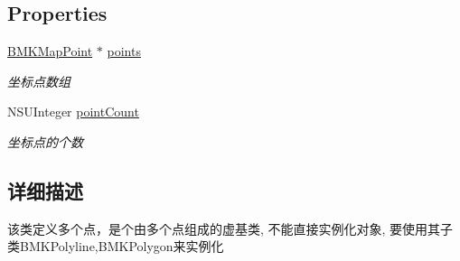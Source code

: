 \subsection*{Properties}
\begin{DoxyCompactItemize}
\item 
\hypertarget{interface_b_m_k_multi_point_aa810056a59644284eb13fca968124e0c}{\hyperlink{struct_b_m_k_map_point}{B\-M\-K\-Map\-Point} $\ast$ \hyperlink{interface_b_m_k_multi_point_aa810056a59644284eb13fca968124e0c}{points}}\label{interface_b_m_k_multi_point_aa810056a59644284eb13fca968124e0c}

\begin{DoxyCompactList}\small\item\em 坐标点数组 \end{DoxyCompactList}\item 
\hypertarget{interface_b_m_k_multi_point_a717b76bf8c1c25ce7ae11c959fb4af9f}{N\-S\-U\-Integer \hyperlink{interface_b_m_k_multi_point_a717b76bf8c1c25ce7ae11c959fb4af9f}{point\-Count}}\label{interface_b_m_k_multi_point_a717b76bf8c1c25ce7ae11c959fb4af9f}

\begin{DoxyCompactList}\small\item\em 坐标点的个数 \end{DoxyCompactList}\end{DoxyCompactItemize}


\subsection{详细描述}
该类定义多个点，是个由多个点组成的虚基类, 不能直接实例化对象, 要使用其子类\-B\-M\-K\-Polyline,B\-M\-K\-Polygon来实例化 

